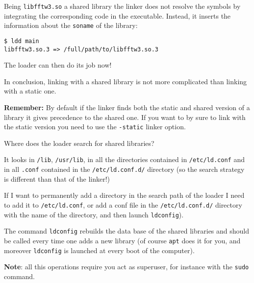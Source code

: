\documentclass[10pt]{beamer}
\begin{document}
\begin{frame}[fragile]

  Being \texttt{libfftw3.so} a shared library the linker does not
  resolve the symbols by integrating the corresponding code in the
  executable. Instead, it inserts the information about the
  \texttt{soname} of the library:
  \smallskip

\begin{verbatim}
$ ldd main
libfftw3.so.3 => /full/path/to/libfftw3.so.3
\end{verbatim}
\smallskip
The loader can then do its job now!
\smallskip

In conclusion, linking with a shared library is not more complicated
than linking with a static one.
\medskip

\textbf{Remember:} By default if the linker finds both the static and
shared version of a library it gives precedence to the shared
one. If you want to by sure to link with the static version you need to use 
the \texttt{-static} linker option.
\end{frame}

\begin{frame}{Where does the loader search for shared libraries?}  

  It looks in \texttt{/lib}, \texttt{/usr/lib}, in all the
  directories contained in \texttt{/etc/ld.conf} and in all \texttt{.conf} contained in the \texttt{/etc/ld.conf.d/}
  directory (so the search strategy is different than that of the
  linker!) \smallskip

  If I want to permanently add a directory in the search path of the
  loader I need to add it to \texttt{/etc/ld.conf}, or add a conf file
  in the \texttt{/etc/ld.conf.d/} directory with the name of the
  directory, and then launch \texttt{ldconfig}).  \smallskip

  The command \texttt{ldconfig} rebuilds the data base of the shared
  libraries and should be called every time one adds a new library (of
  course \texttt{apt} does it for you, and moreover
  \texttt{ldconfig} is launched at every boot of the computer).
  \smallskip

  \textbf{Note}: all this operations require you act as superuser, for
  instance with the \texttt{sudo} command.
\end{frame}
\end{document}
